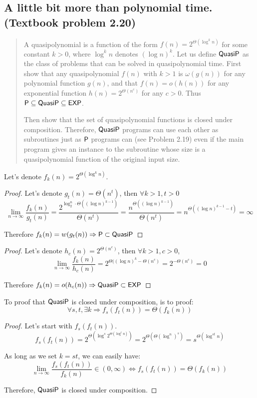 \subsection*{A little bit more than polynomial time. (Textbook problem 2.20)}
    \begin{quote}
    A quasipolynomial is a function of the form $f(n) = 2^{\Theta(\log^k n)}$ for some constant $k > 0$, where $\log^k n$ denotes $(\log n)^k$.
    Let us define $\QuasiP$ as the class of problems that can be solved in quasipolynomial time.
    First show that any quasipolynomial $f(n)$ with $k > 1$ is $\omega(g(n))$ for any polynomial function $g(n)$,
    and that $f(n) = o(h(n))$ for any exponential function $h(n) = 2^{\Theta(n^c)}$ for any $c > 0$.
    Thus $\P \subseteq \QuasiP \subseteq \EXP$.

    Then show that the set of quasipolynomial functions is closed under composition.
    Therefore, $\QuasiP$ programs can use each other as subroutines just as $\P$ programs can (see Problem 2.19)
    even if the main program gives an instance to the subroutine whose size is a quasipolynomial function of the original input size.
    \end{quote}

 \solution

    Let's denote $f_k(n) =  2^{\Theta(\log^k n)}$.
\begin{proof}
    Let's denote $g_t(n) = \Theta(n^t)$, then $\forall k>1, t>0$
    $$\lim_{n \to \infty} \frac{f_k(n)}{g_t(n)} = \frac{2^{\log_2^n \cdot \Theta((\log n)^{k-1})}} {\Theta(n^t)} = \frac{n^{\Theta((\log n)^{k-1})}}{\Theta(n^t)} = n^{\Theta((\log n)^{k-1} - t)} = \infty$$

    Therefore $f_k(n) = w(g_t(n)) \Rightarrow \P \subset \QuasiP$
\end{proof}

\begin{proof}
    Let's denote $h_c(n) = 2^{\Theta(n^c)}$, then $\forall k>1, c>0$,
    $$\lim_{n \to \infty} \frac{f_k(n)}{h_c(n)} = 2^{\Theta((\log n)^k - \Theta(n^c)} = 2^{-\Theta(n^c)} = 0$$

    Therefore $f_k(n) = o(h_c(n)) \Rightarrow \QuasiP \subset \EXP$
\end{proof}

To proof that $\QuasiP$ is closed under composition, is to proof: 
    $$\forall s, t, \exists k \Rightarrow f_s(f_t(n)) = \Theta(f_k(n))$$
\begin{proof}
    Let's start with $f_s(f_t(n))$.
    $$f_s(f_t(n)) = 2^{\Theta(\log^s 2^{\Theta(\log^t n)})} = 2^{\Theta(\Theta(\log^ n)^s)} = s^{\Theta(\log^{st} n)}$$

    As long as we set $k = st$, we can easily have:
    $$\lim_{n \to \infty} \frac{f_s(f_t(n))}{f_k(n)} \in (0, \infty) \Leftrightarrow f_s(f_t(n)) = \Theta(f_k(n))$$

    Therefore, $\QuasiP$ is closed under composition.
\end{proof}